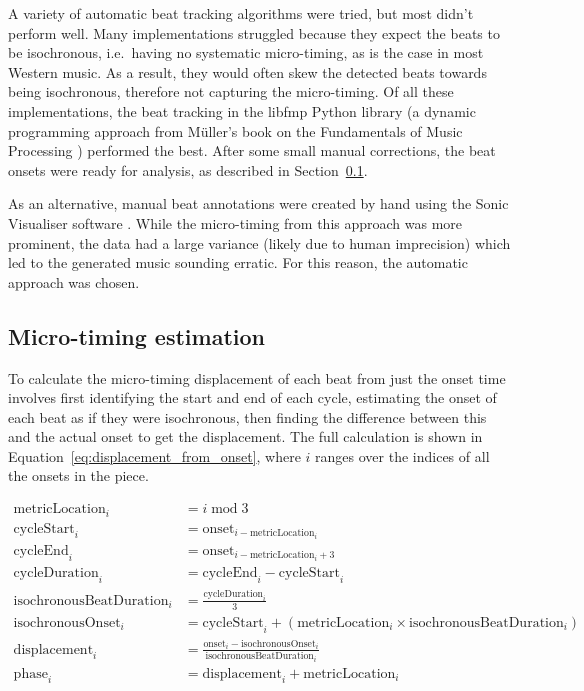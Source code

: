 \documentclass[12pt,twoside,openright]{report}
\begin{document}
A variety of automatic beat tracking algorithms were tried, but most didn't
perform well. Many implementations struggled because they expect the beats to be
isochronous, i.e.\ having no systematic micro-timing, as is the case in most
Western music. As a result, they would often skew the detected beats towards
being isochronous, therefore not capturing the micro-timing. Of all these
implementations, the beat tracking in the libfmp Python library \cite{mueller2021} (a
dynamic programming approach from Müller's book on the Fundamentals of Music Processing
\cite{mueller2021b}) performed the best. After some
small manual corrections, the beat onsets were ready for analysis, as described
in Section~\ref{waltz_micro-timing}.

As an alternative, manual beat annotations were created by hand using the Sonic
Visualiser software \cite{cannam2010}. While the micro-timing from this approach was
more prominent, the data had a large variance (likely due to human imprecision) which led to the generated music sounding erratic. For this reason, the automatic approach was chosen.


\subsection{Micro-timing estimation} \label{waltz_micro-timing}

To calculate the micro-timing displacement of each beat from just the onset time
involves first identifying the start and end of each cycle, estimating the onset
of each beat as if they were isochronous, then finding the difference between this
and the actual onset to get the displacement. The full calculation is shown in
Equation~\ref{eq:displacement_from_onset}, where $i$ ranges over the indices of all the onsets in the piece.

\begin{equation}
\begin{split}
    \mathrm{metricLocation}_i &= i \;\mathrm{mod}\; 3 \\
    \mathrm{cycleStart}_i     &= \mathrm{onset}_{i-\mathrm{metricLocation}_i} \\
    \mathrm{cycleEnd}_i       &= \mathrm{onset}_{i-\mathrm{metricLocation}_i+3} \\
    \mathrm{cycleDuration}_i  &= \mathrm{cycleEnd}_i - \mathrm{cycleStart}_i \\
    \mathrm{isochronousBeatDuration}_i &= \frac{\mathrm{cycleDuration}_i}{3} \\
    \mathrm{isochronousOnset}_i &= \mathrm{cycleStart}_i + (\mathrm{metricLocation}_i \times \mathrm{isochronousBeatDuration}_i) \\
    \mathrm{displacement}_i &= \frac{\mathrm{onset}_i-\mathrm{isochronousOnset}_i}{\mathrm{isochronousBeatDuration}_i} \\
    \mathrm{phase}_i          &= \mathrm{displacement}_i + \mathrm{metricLocation}_i
\end{split}
\label{eq:displacement_from_onset}
\end{equation}
\end{document}
